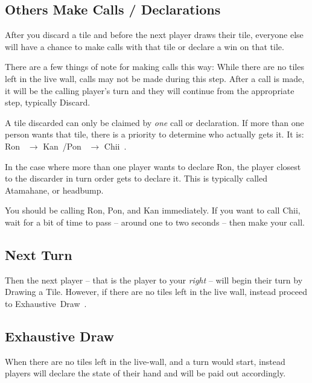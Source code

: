 

\subsection{Others Make Calls / Declarations}\label{core:ssec:others-call-declare}

After you discard a tile and before the next player draws their tile, everyone else will have a chance to make calls with that tile or declare a win on that tile.

There are a few things of note for making calls this way: While there are no tiles left in the live wall, calls may not be made during this step. After a call is made, it will be the calling player's turn and they will continue from the appropriate step, typically Discard.

A tile discarded can only be claimed by \emph{one} call or declaration. If more than one person wants that tile, there is a priority to determine who actually gets it. It is: Ron~ \(\rightarrow\) Kan~/Pon~ \(\rightarrow\) Chii~.

In the case where more than one player wants to declare Ron, the player closest to the discarder in turn order gets to declare it. This is typically called Atamahane, or headbump.

You should be calling Ron, Pon, and Kan immediately. If you want to call Chii, wait for a bit of time to pass -- around one to two seconds -- then make your call.

\subsection{Next Turn}\label{core:ssec:next-turn}

Then the next player -- that is the player to your \emph{right} -- will begin their turn by Drawing a Tile. However, if there are no tiles left in the live wall, instead proceed to Exhaustive~Draw~.

\subsection{Exhaustive Draw}\label{core:ssec:exhaustive-draw}

When there are no tiles left in the live-wall, and a turn would start, instead players will declare the state of their hand and will be paid out accordingly.

